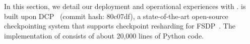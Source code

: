 


In this section, we detail our deployment and operational experiences with \sys{}.
\sys{} is built upon DCP~\cite{torch-dcp} (commit hash: 80c07df), a state-of-the-art open-source checkpointing system that supports checkpoint resharding for FSDP~\cite{fsdp}. The implementation of 
\sys{} consists of about 20,000 lines of Python code.


